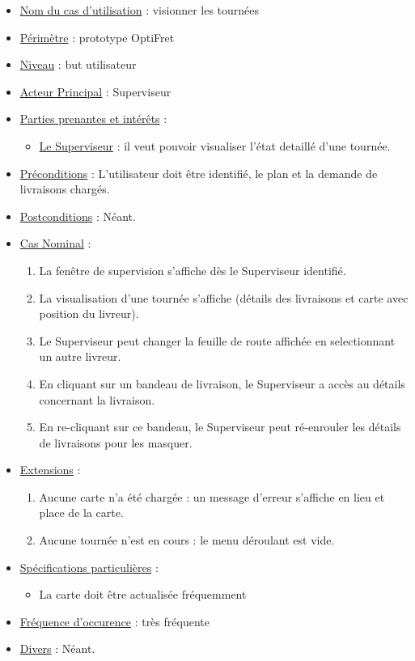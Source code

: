 \documentclass[a4paper, 10pt]{article}
\begin{document}
\begin{itemize}[label = \textbullet, font = \color{orange}]
    \item \underline{Nom du cas d'utilisation} : visionner les tournées
    \item \underline{Périmètre} : prototype OptiFret
    \item \underline{Niveau} : but utilisateur
    \item \underline{Acteur Principal} : Superviseur
    \item \underline{Parties prenantes et intérêts} :
        \begin{itemize}[label = \textbullet, font = \color{blue}]
            \item \underline{Le Superviseur} : il veut pouvoir visualiser
                l'état detaillé d'une tournée.
        \end{itemize}
    \item \underline{Préconditions} : L'utilisateur doit être identifié, le
        plan et la demande de livraisons chargés.
    \item \underline{Postconditions} : Néant.
    \item \underline{Cas Nominal} :
    \begin{enumerate}
        \item La fenêtre de supervision s'affiche dès le Superviseur identifié.
        \item La visualisation d'une tournée s'affiche (détails des livraisons
            et carte avec position du livreur).
        \item Le Superviseur peut changer la feuille de route affichée en
            selectionnant un autre livreur.
        \item En cliquant sur un bandeau de livraison, le Superviseur a accès
            au détails concernant la livraison.
        \item En re-cliquant sur ce bandeau, le Superviseur peut ré-enrouler
            les détails de livraisons pour les masquer.
    \end{enumerate}
    \item \underline{Extensions} :
    \begin{enumerate}
        \item Aucune carte n'a été chargée : un message d'erreur s'affiche en
            lieu et place de la carte.
        \item Aucune tournée n'est en cours : le menu déroulant est vide.
    \end{enumerate}
    \item \underline{Spécifications particulières} :
    \begin{itemize}[label = \textbullet, font = \color{blue}]
        \item La carte doit être actualisée fréquemment
    \end{itemize}
    \item \underline{Fréquence d'occurence} : très fréquente
    \item \underline{Divers} : Néant.
\end{itemize}
\end{document}
